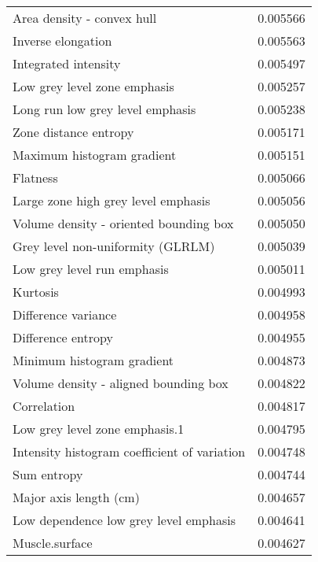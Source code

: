 \begin{longtable}{|lr|}
Area density - convex hull                         &        0.005566 \\
Inverse elongation                                 &        0.005563 \\
Integrated intensity                               &        0.005497 \\
Low grey level zone emphasis                       &        0.005257 \\
Long run low grey level emphasis                   &        0.005238 \\
Zone distance entropy                              &        0.005171 \\
Maximum histogram gradient                         &        0.005151 \\
Flatness                                           &        0.005066 \\
Large zone high grey level emphasis                &        0.005056 \\
Volume density - oriented bounding box             &        0.005050 \\
Grey level non-uniformity (GLRLM)                  &        0.005039 \\
Low grey level run emphasis                        &        0.005011 \\
Kurtosis                                           &        0.004993 \\
Difference variance                                &        0.004958 \\
Difference entropy                                 &        0.004955 \\
Minimum histogram gradient                         &        0.004873 \\
Volume density - aligned bounding box              &        0.004822 \\
Correlation                                        &        0.004817 \\
Low grey level zone emphasis.1                     &        0.004795 \\
Intensity histogram coefficient of variation       &        0.004748 \\
Sum entropy                                        &        0.004744 \\
Major axis length (cm)                             &        0.004657 \\
Low dependence low grey level emphasis             &        0.004641 \\
Muscle.surface                                     &        0.004627 \\

\end{longtable}
